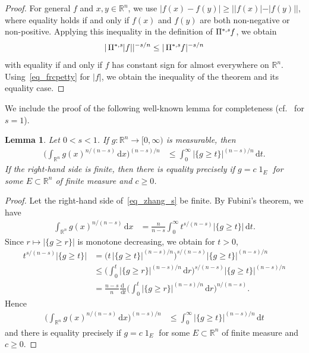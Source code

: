 \documentclass{amsart}
\newtheorem{lemma}[theorem]{Lemma}
\newcommand{\ofpp}[1]{\operatorname{\Pi^{\ast,{\it #1}}}\!}
\newcommand{\dvtex}{\,\mathrm{d}}
\newcommand{\vol}[1]{ \vert #1\vert}
\renewcommand{\chi}{\operatorname{1}}
\begin{document}
\begin{proof}
For general $f$ and $x,y\in \mathbb R^{n}$, we use
$\vert f(x) - f(y) \vert \geq \vert \vert f(x) \vert - \vert f(y)
\vert \vert $, where equality holds if and only if $f(x)$ and $f(y)$ are
both non-negative or non-positive. Applying this inequality in the definition
of $\ofpp sf$, we obtain
%
\begin{equation*}
\vol{\ofpp s{|f|}}^{-s/n} \leq \vol{\ofpp s{f}}^{-s/n}
\end{equation*}
%
with equality if and only if $f$ has constant sign for almost everywhere
on $\mathbb R^{n}$. Using~\eqref{eq_frcpetty} for $\vert f\vert $, we obtain
the inequality of the theorem and its equality case.
\end{proof}

\goodbreak
We include the proof of the following well-known lemma for completeness
(cf.\ \cite{Zhang99} for $s=1$).

\begin{lemma}%
\label{lem_zhang_s}
Let $0<s<1$. If $g:\mathbb R^{n}\to [0,\infty )$ is measurable, then
%
\begin{align}
\label{eq_zhang_s}
\Big(\int _{\mathbb R^{n}} g(x)^{n/({n-s})}\dvtex x\Big)^{({n-s})/n} &
\le \int _{0}^{\infty }\vol{\{g \ge t\}}^{({n-s})/n}\dvtex t.
\end{align}
%
If the right-hand side is finite, then there is equality precisely if
$g=c\chi _{E}$ for some $E\subset \mathbb R^{n}$ of finite measure and
$c\ge 0$.
\end{lemma}

\begin{proof}
Let the right-hand side of~\eqref{eq_zhang_s} be finite. By Fubini's theorem,
we have
%
\begin{align}
\int _{\mathbb R^{n}} g(x)^{n/({n-s})}\dvtex x &= \frac{n}{n-s} \int _{0}^{
\infty }t^{ s/( {n-s})} \vol{\{g \ge t\}} \dvtex t.
\nonumber \end{align}
%
Since $r\mapsto \vol{\{g \ge r\}}$ is monotone decreasing, we obtain for
$t>0$,
%
\begin{align}
t^{ s/({n-s})} \vol{\{g \ge t\}} &=\big(t\, \vol{\{g \ge t\}}^{( {n-s})/n}
\big)^{ s/({n-s})} \vol{\{g \ge t\}}^{({n-s})/n}
\nonumber \\
&\le \bigg(\int _{0}^{t} \vol{\{g \ge r\}}^{({n-s})/n}\dvtex r\bigg)^{ s/({n-s})} \vol{\{g \ge t\}}^{({n-s})/n}
\nonumber \\
&=\frac{n-s}{n} \frac{\dvtex \,\, }{\dvtex t} \bigg(\int _{0}^{t} \vol{\{g \ge r\}}^{({n-s})/n}\dvtex r\bigg)^{ n/({n-s})}.
\nonumber \end{align}
%
Hence
%
\begin{align}
\Big(\int _{\mathbb R^{n}} g(x)^{ n/({n-s})}\dvtex x\Big)^{({n-s})/n} &
\le \int _{0}^{\infty }\vol{\{g \ge t\}}^{({n-s})/n}\dvtex t
\nonumber \end{align}
%
and there is equality precisely if $g=c\chi _{E}$ for some
$E\subset \mathbb R^{n}$ of finite measure and $c\ge 0$.
\end{proof}
\end{document}
